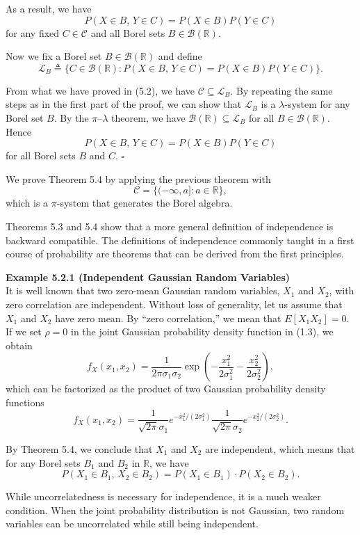 As a result, we have
\begin{equation}
P(X \in B,\, Y \in C)=P(X \in B)P(Y \in C)
\tag{5.2}
\end{equation}
for any fixed $C \in \mathcal{C}$ and all Borel sets $B \in \mathcal{B}(\mathbb{R})$.

Now we fix a Borel set $B \in \mathcal{B}(\mathbb{R})$ and define
\[
\mathcal{L}_B \triangleq \{C \in \mathcal{B}(\mathbb{R}) : P(X \in B,\, Y \in C)=P(X \in B)P(Y \in C)\}.
\]

From what we have proved in (5.2), we have $\mathcal{C} \subseteq \mathcal{L}_B$. By repeating the same steps as in the first part of the proof, we can show that $\mathcal{L}_B$ is a $\lambda$-system for any Borel set $B$. By the $\pi$--$\lambda$ theorem, we have $\mathcal{B}(\mathbb{R}) \subseteq \mathcal{L}_B$ for all $B \in \mathcal{B}(\mathbb{R})$. Hence
\[
P(X \in B,\, Y \in C)=P(X \in B)P(Y \in C)
\]
for all Borel sets $B$ and $C$. \hfill $\square$

We prove Theorem 5.4 by applying the previous theorem with
\[
\mathcal{C}=\{(-\infty,a] : a \in \mathbb{R}\},
\]
which is a $\pi$-system that generates the Borel algebra.

Theorems 5.3 and 5.4 show that a more general definition of independence is backward compatible. The definitions of independence commonly taught in a first course of probability are theorems that can be derived from the first principles.

\textbf{Example 5.2.1 (Independent Gaussian Random Variables)} \\
It is well known that two zero-mean Gaussian random variables, $X_1$ and $X_2$, with zero correlation are independent. Without loss of generality, let us assume that $X_1$ and $X_2$ have zero mean. By ``zero correlation,'' we mean that $E[X_1X_2]=0$. If we set $\rho=0$ in the joint Gaussian probability density function in (1.3), we obtain
\[
f_X(x_1,x_2)=\frac{1}{2\pi\sigma_1\sigma_2}\exp\left(-\frac{x_1^2}{2\sigma_1^2}-\frac{x_2^2}{2\sigma_2^2}\right),
\]
which can be factorized as the product of two Gaussian probability density functions
\[
f_X(x_1,x_2)=\frac{1}{\sqrt{2\pi}\sigma_1}e^{-x_1^2/(2\sigma_1^2)}
\frac{1}{\sqrt{2\pi}\sigma_2}e^{-x_2^2/(2\sigma_2^2)}.
\]

By Theorem 5.4, we conclude that $X_1$ and $X_2$ are independent, which means that for any Borel sets $B_1$ and $B_2$ in $\mathbb{R}$, we have
\[
P(X_1 \in B_1,\, X_2 \in B_2)=P(X_1 \in B_1)\cdot P(X_2 \in B_2).
\]

While uncorrelatedness is necessary for independence, it is a much weaker condition. When the joint probability distribution is not Gaussian, two random variables can be uncorrelated while still being independent.

